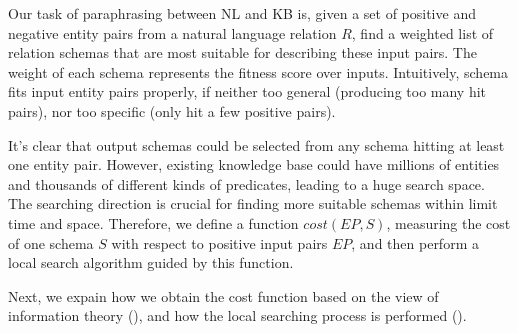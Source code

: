 %



Our task of paraphrasing between NL and KB is,
given a set of positive and negative
entity pairs from a natural language relation $R$,
find a weighted list of  relation schemas that are most suitable
for describing these input pairs.
The weight of each schema represents the fitness score over inputs.
Intuitively, schema fits input entity pairs properly, if neither too general
(producing too many hit pairs),
nor too specific (only hit a few positive pairs).

It's clear that output schemas could be selected from any schema hitting at least one entity pair.
However, existing knowledge base could have millions of entities and thousands of different
kinds of predicates, leading to a huge search space.
The searching direction is crucial for finding more suitable schemas within
limit time and space.
Therefore, we define a function $cost(EP, S)$, measuring the cost of one schema $S$
with respect to positive input pairs $EP$, and then perform a local search algorithm guided by this function.

Next, we expain how we obtain the cost function based on the view of information theory (),
and how the local searching process is performed ().

